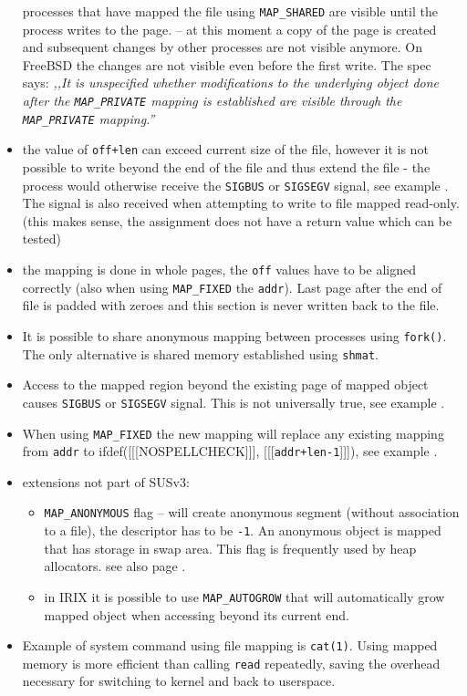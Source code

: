 \begin{itemize}
processes that have mapped the file using \texttt{MAP\_SHARED} are visible
until the process writes to the page.
-- at this moment a copy of the page is created and subsequent changes by
other processes are not visible anymore.
On FreeBSD the changes are not visible even before the first write.
The spec says:
\emph{,,It is unspecified whether modifications to the underlying object done
after the \texttt{MAP\_PRIVATE} mapping is established are visible through the
\texttt{MAP\_PRIVATE} mapping.''}
\item the value of \texttt{off+l{}en} can exceed current size of the file,
however it is not possible to write beyond the end of the file and thus
extend the file - the process would otherwise receive the \texttt{SIGBUS} or
\texttt{SIGSEGV} signal, see example .
The signal is also received when attempting to write to file mapped read-only.
(this makes sense, the assignment does not have a return value which can be
tested)
\item the mapping is done in whole pages, the \texttt{off} values have to
be aligned correctly (also when using \texttt{MAP\_FIXED} the \texttt{addr}).
Last page after the end of file is padded with zeroes and this section is
never written back to the file.
\item It is possible to share anonymous mapping between processes using
\texttt{fork()}. The only alternative is shared memory established using
\texttt{shmat}.
\item Access to the mapped region beyond the existing page of mapped object
causes \texttt{SIGBUS} or \texttt{SIGSEGV} signal.
This is not universally true, see example .
\item When using \texttt{MAP\_FIXED} the new mapping will replace any existing
mapping from \texttt{addr} to
ifdef([[[NOSPELLCHECK]]], [[[\texttt{addr+l{}en-1}]]]), see example
.
\item extensions not part of SUSv3:
    \begin{itemize}
    \setlength{\itemsep}{0.8\itemsep}
    \item \texttt{MAP\_ANONYMOUS} flag -- will create anonymous segment
    (without association to a file), the descriptor has to be \texttt{-1}.
    An anonymous object is mapped that has storage in swap area.
    This flag is frequently used by heap allocators.
    see also page \pageref{SOLARIS_PROC_ADDR_SPACE}.
    \item in IRIX it is possible to use \texttt{MAP\_AUTOGROW} that will
    automatically grow mapped object when accessing beyond its current end.
    \end{itemize}
\item Example of system command using file mapping is \texttt{cat(1)}. 
Using mapped memory is more efficient than calling \texttt{read} repeatedly,
saving the overhead necessary for switching to kernel and back to userspace.
\end{itemize}

